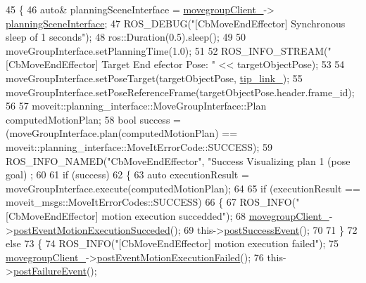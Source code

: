 \begin{DoxyCode}
45 \{
46   \textcolor{keyword}{auto}& planningSceneInterface = \hyperlink{classcl__move__group__interface_1_1CbMoveEndEffector_a86583cb37788b461fc8bb38102a8c0ed}{movegroupClient\_}->
      \hyperlink{classcl__move__group__interface_1_1ClMoveGroup_a11bfab580f36e2ad32c9b37d6f58f44c}{planningSceneInterface};
47   ROS\_DEBUG(\textcolor{stringliteral}{"[CbMoveEndEffector] Synchronous sleep of 1 seconds"});
48   ros::Duration(0.5).sleep();
49 
50   moveGroupInterface.setPlanningTime(1.0);
51 
52   ROS\_INFO\_STREAM(\textcolor{stringliteral}{"[CbMoveEndEffector] Target End efector Pose: "} << targetObjectPose);
53 
54   moveGroupInterface.setPoseTarget(targetObjectPose, \hyperlink{classcl__move__group__interface_1_1CbMoveEndEffector_a4b6f4468b2db565a07119ac90c067436}{tip\_link\_});
55   moveGroupInterface.setPoseReferenceFrame(targetObjectPose.header.frame\_id);
56 
57   moveit::planning\_interface::MoveGroupInterface::Plan computedMotionPlan;
58   \textcolor{keywordtype}{bool} success = (moveGroupInterface.plan(computedMotionPlan) == 
      moveit::planning\_interface::MoveItErrorCode::SUCCESS);
59   ROS\_INFO\_NAMED(\textcolor{stringliteral}{"CbMoveEndEffector"}, \textcolor{stringliteral}{"Success Visualizing plan 1 (pose goal) %
      ;
60 
61   \textcolor{keywordflow}{if} (success)
62   \{
63     \textcolor{keyword}{auto} executionResult = moveGroupInterface.execute(computedMotionPlan);
64 
65     \textcolor{keywordflow}{if} (executionResult == moveit\_msgs::MoveItErrorCodes::SUCCESS)
66     \{
67       ROS\_INFO(\textcolor{stringliteral}{"[CbMoveEndEffector] motion execution succedded"});
68       \hyperlink{classcl__move__group__interface_1_1CbMoveEndEffector_a86583cb37788b461fc8bb38102a8c0ed}{movegroupClient\_}->\hyperlink{classcl__move__group__interface_1_1ClMoveGroup_aebaf269db373d41837bae87651458e54}{postEventMotionExecutionSucceded}();
69       this->\hyperlink{classsmacc_1_1SmaccAsyncClientBehavior_adf18efe1f0e4eacc1277b8865a8a94b1}{postSuccessEvent}();
70 
71     \}
72     \textcolor{keywordflow}{else}
73     \{
74       ROS\_INFO(\textcolor{stringliteral}{"[CbMoveEndEffector] motion execution failed"});
75       \hyperlink{classcl__move__group__interface_1_1CbMoveEndEffector_a86583cb37788b461fc8bb38102a8c0ed}{movegroupClient\_}->\hyperlink{classcl__move__group__interface_1_1ClMoveGroup_a39dc3871d29b2af1ab739057f6ca6daa}{postEventMotionExecutionFailed}();
76       this->\hyperlink{classsmacc_1_1SmaccAsyncClientBehavior_af6fa358cb1ab5ed16791a201f59260e0}{postFailureEvent}();
}
\end{DoxyCode}
